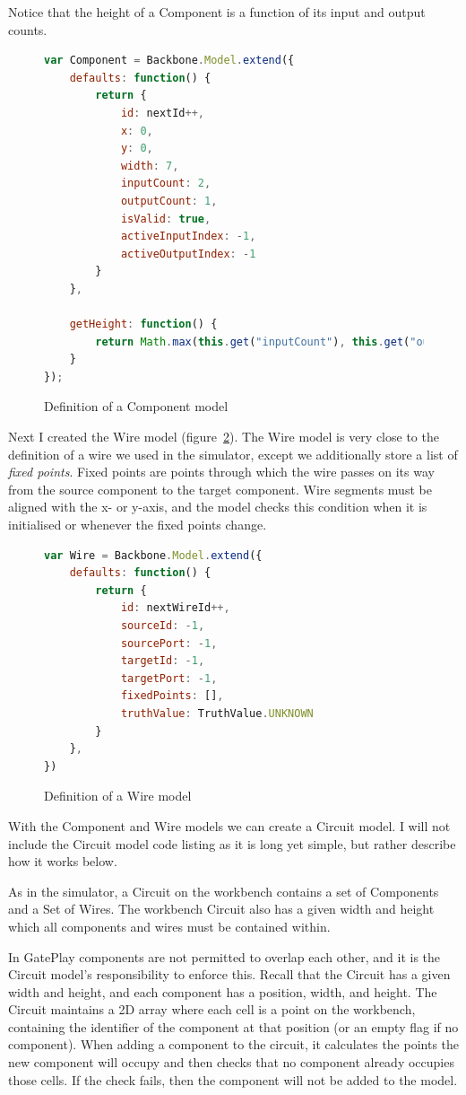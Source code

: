 Notice that the height of a Component is a function of its input and output counts.

\begin{figure}
\begin{lstlisting}[language=JavaScript]
var Component = Backbone.Model.extend({
	defaults: function() {
    	return {
        	id: nextId++,
            x: 0,
            y: 0,
            width: 7,
            inputCount: 2,
            outputCount: 1,
            isValid: true,
            activeInputIndex: -1,
            activeOutputIndex: -1
        }
    },

    getHeight: function() {
        return Math.max(this.get("inputCount"), this.get("outputCount")) * 2 + 1;
    }
});
\end{lstlisting}
\caption{Definition of a Component model}
\label{fig:componentmodel}
\end{figure}

Next I created the Wire model (figure~\ref{fig:wiremodel}). The Wire model is very close to the definition of a wire we used in the simulator, except we additionally store a list of \textit{fixed points}. Fixed points are points through which the wire passes on its way from the source component to the target component. Wire segments must be aligned with the x- or y-axis, and the model checks this condition when it is initialised or whenever the fixed points change.

\begin{figure}
\begin{lstlisting}[language=JavaScript]
var Wire = Backbone.Model.extend({
	defaults: function() {
    	return {
        	id: nextWireId++,
        	sourceId: -1,
        	sourcePort: -1,
       	 	targetId: -1,
        	targetPort: -1,
        	fixedPoints: [],
        	truthValue: TruthValue.UNKNOWN
    	}
	},
})
\end{lstlisting}
\caption{Definition of a Wire model}
\label{fig:wiremodel}
\end{figure}

With the Component and Wire models we can create a Circuit model. I will not include the Circuit model code listing as it is long yet simple, but rather describe how it works below. 

As in the simulator, a Circuit on the workbench contains a set of Components and a Set of Wires. The workbench Circuit also has a given width and height which all components and wires must be contained within.

In GatePlay components are not permitted to overlap each other, and it is the Circuit model's responsibility to enforce this. Recall that the Circuit has a given width and height, and each component has a position, width, and height. The Circuit maintains a 2D array where each cell is a point on the workbench, containing the identifier of the component at that position (or an empty flag if no component). When adding a component to the circuit, it calculates the points the new component will occupy and then checks that no component already occupies those cells. If the check fails, then the component will not be added to the model.

